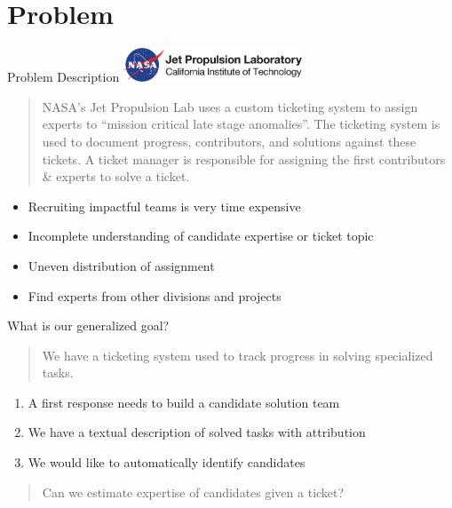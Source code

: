 \documentclass[10pt]{beamer}
\begin{document}
\section{Problem}

\begin{frame}{Problem Description}
  \includegraphics[width=0.4\textwidth]{./logo.png}
  \begin{quote}
    {\footnotesize
    NASA's Jet Propulsion Lab uses a custom ticketing system to
    assign experts to ``mission critical late stage anomalies''.
    The ticketing system is used to document progress, contributors, and
    solutions against these tickets.
    A ticket manager is responsible for assigning the first contributors \&
    experts to solve a ticket.
    }
  \end{quote}

  \begin{itemize}
  \item Recruiting impactful teams is very time expensive
  \item Incomplete understanding of candidate expertise or ticket topic
  \item Uneven distribution of assignment
  \item Find experts from other divisions and projects
  \end{itemize}

\end{frame}

\begin{frame}{What is our generalized goal?}

  \begin{quote}
    We have a ticketing system used to track progress in solving specialized tasks.
  \end{quote}

  \begin{enumerate}
  \item A first response needs to build a candidate solution team
  \item We have a textual description of solved tasks with attribution
  \item We would like to automatically identify candidates
  \end{enumerate}


  \begin{quote}
    Can we estimate expertise of candidates given a ticket?
  \end{quote}
\end{frame}
\end{document}
